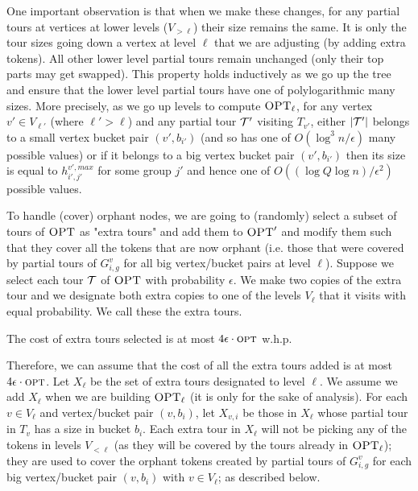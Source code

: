 \documentclass[twoside,leqno]{article}
\newcommand{\calT}{{\cal T}}
\newcommand{\opt}{\mbox{\sc opt}}
\newcommand{\OPT}{\mbox{\sc OPT}}
\newcommand{\eps}{\epsilon}
\begin{document}
One important observation is that when we make these changes, for any partial tours at vertices at lower levels ($V_{>\ell}$)
their size remains the same. It is only the tour sizes going down a vertex at level $\ell$ that we are adjusting (by adding extra
tokens). All other lower level partial tours remain unchanged (only their top parts may get swapped). This property holds inductively
as we go up the tree and ensure that the lower level partial tours have one of polylogarithmic many sizes.
More precisely, as we go up levels to compute  $\OPT_\ell$, for any vertex $v'\in V_{\ell'}$ (where $\ell'>\ell$) and any partial
tour $\calT'$ visiting $T_{v'}$, either $|\calT'|$ belongs to a small vertex bucket pair $(v',b_{i'})$ (and so has one of
$O(\log^3 n/\eps)$ many possible values) or if it belongs to a big
vertex bucket pair $(v',b_{i'})$ then its size is equal to $h^{v',max}_{i',j'}$ for some group $j'$ and hence one of
$O((\log Q\log n)/\eps^2)$ possible values.

To handle (cover) orphant nodes, we are going to (randomly) select a subset of tours of $\OPT$ as "extra tours" and add them to $\OPT'$ and modify them
such that they cover all the tokens that are now orphant (i.e. those that were covered by partial tours of $G^v_{i,g}$ for all big vertex/bucket pairs at level $\ell$).
Suppose we select each tour $\calT$ of $\OPT$ with probability $\eps$. We make two copies of the extra tour and we designate both extra copies to one of the levels $V_\ell$ that it visits with equal probability. We call these the extra tours.
\vspace{-1.5mm}
\begin{lemma}\label{lem:extra-cost}
The cost of extra tours selected is at most $4\eps\cdot\opt$ w.h.p.
\end{lemma}
\vspace{-1.5mm}

Therefore, we can assume that the cost of all the extra tours added  is at most $4\eps\cdot\opt$.
Let $X_\ell$ be the set of extra tours designated to level $\ell$. 
We assume we add $X_\ell$ when we are building $\OPT_\ell$
(it is only for the sake of analysis). For each $v\in V_\ell$ and vertex/bucket pair $(v,b_i)$, let $X_{v,i}$ be those in $X_\ell$ whose partial tour in $T_v$ has
a size in bucket $b_i$. Each extra tour in $X_\ell$
will not be picking any of the tokens in levels $V_{<\ell}$ (as they will be covered by the tours already in $\OPT_\ell$); 
they are used to cover the orphant tokens created by partial tours
of $G^v_{i,g}$ for each big vertex/bucket pair $(v,b_i)$ with $v\in V_\ell$; as described below. 
\end{document}
